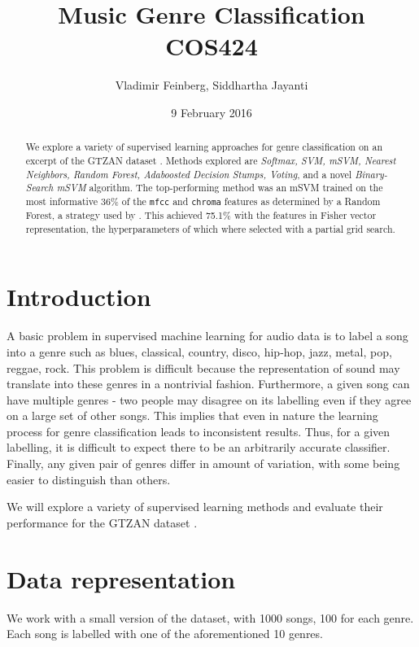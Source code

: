 \documentclass{article}
\title{Music Genre Classification\\\large COS424}
\author{Vladimir Feinberg, Siddhartha Jayanti}
\date{9 February 2016}
\begin{document}
\maketitle

\begin{abstract}

We explore a variety of supervised learning approaches for genre classification on an excerpt of the GTZAN dataset \cite{TC}. Methods explored are {\em Softmax, SVM, mSVM, Nearest Neighbors, Random Forest, Adaboosted Decision Stumps, Voting}, and a novel {\em Binary-Search mSVM} algorithm.
The top-performing method was an mSVM trained on the most informative 36\% of the \texttt{mfcc} and \texttt{chroma} features as determined by a Random Forest, a strategy used by \cite{vox}. This achieved 75.1\% with the features in Fisher vector representation, the hyperparameters of which where selected with a partial grid search.

\end{abstract}
 \section{Introduction}

A basic problem in supervised machine learning for audio data is to label a song into a genre such as blues, classical, country, disco, hip-hop, jazz, metal, pop, reggae, rock.
This problem is difficult because the representation of sound may translate into these genres in a nontrivial fashion.
Furthermore, a given song can have multiple genres - two people may disagree on its labelling even if they agree on a large set of other songs. This implies that even in nature the learning process for genre classification leads to inconsistent results. Thus, for a given labelling, it is difficult to expect there to be an arbitrarily accurate classifier.
Finally, any given pair of genres differ in amount of variation, with some being easier to distinguish than others.

We will explore a variety of supervised learning methods and evaluate their performance for the GTZAN dataset \cite{TC}.

\section{Data representation}

We work with a small version of the dataset, with 1000 songs, 100 for each genre. Each song is labelled with one of the aforementioned 10 genres.
\end{document}
